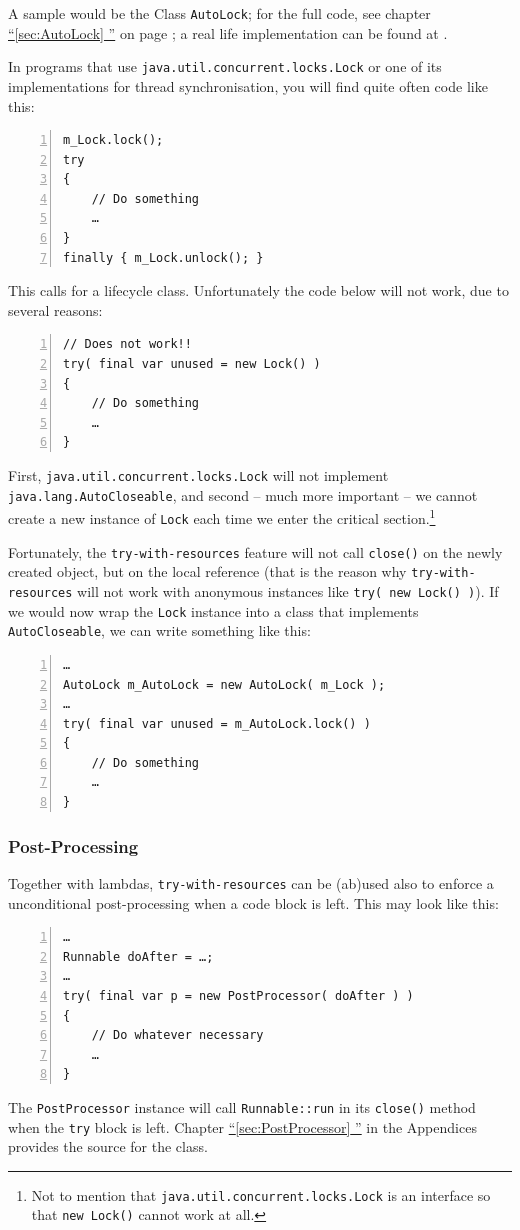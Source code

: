 \documentclass[12pt,a4paper,titlepage, parskip=half, headsepline, footsepline, cleardoubleplain]{scrbook}
\newcommand*{\tqfullref}[1]{\hyperref[{#1}]{“\ref*{#1} \nameref*{#1}”}}
\newcommand*{\tqfullvref}[1]{\hyperref[{#1}]{“\ref*{#1} \nameref*{#1}”} on page \pageref{#1}}
\begin{document}
A sample would be the Class \lstinline|AutoLock|; for the full code, see chapter \tqfullvref{sec:AutoLock}; a real life implementation can be found at \autocite{TQUADRAT_ORG_FOUNDATION_AUTOLOCK}.

In programs that use \lstinline|java.util.concurrent.locks.Lock| or one of its implementations for thread synchronisation, you will find quite often code like this:
\begin{lstlisting}[numbers=left]
m_Lock.lock();
try
{
    // Do something
    …
}
finally { m_Lock.unlock(); }
\end{lstlisting}

This calls for a lifecycle class. Unfortunately the code below will not work, due to several reasons:
\begin{lstlisting}[numbers=left]
// Does not work!!
try( final var unused = new Lock() )
{
    // Do something
    …
}
\end{lstlisting}

First, \lstinline|java.util.concurrent.locks.Lock| will not implement \lstinline|java.lang.AutoCloseable|, and second – much more important – we cannot create a new instance of \lstinline|Lock| each time we enter the critical section.\footnote{Not to mention that \lstinline|java.util.concurrent.locks.Lock| is an interface so that \lstinline|new Lock()| cannot work at all.}

Fortunately, the \lstinline|try-with-resources| feature will not call \lstinline|close()| on the newly created object, but on the local reference (that is the reason why \lstinline|try-with-resources| will not work with anonymous instances like \lstinline|try( new Lock() )|). If we would now wrap the \lstinline|Lock| instance into a class that implements \lstinline|AutoCloseable|, we can write something like this:
\begin{lstlisting}[numbers=left]
…
AutoLock m_AutoLock = new AutoLock( m_Lock );
…
try( final var unused = m_AutoLock.lock() )
{
    // Do something
    …
}
\end{lstlisting}

\subsubsection{Post-Processing}
Together with lambdas, \lstinline|try-with-resources| can be (ab)used also to enforce a unconditional post-processing when a code block is left. This may look like this:
\begin{lstlisting}[numbers=left]
…
Runnable doAfter = …;
…
try( final var p = new PostProcessor( doAfter ) )
{
    // Do whatever necessary
    …
}
\end{lstlisting}
The \lstinline|PostProcessor| instance will call \lstinline|Runnable::run| in its \lstinline|close()| method when the \lstinline|try| block is left. Chapter \tqfullref{sec:PostProcessor} in the Appendices provides the source for the class.
\end{document}
